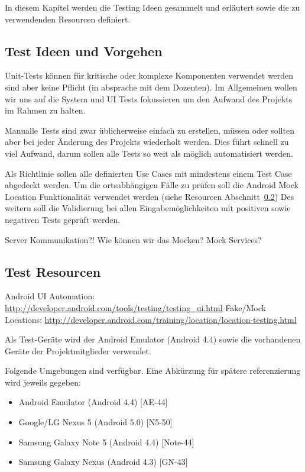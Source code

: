In diesem Kapitel werden die Testing Ideen gesammelt und erläutert sowie die zu verwendenden Resourcen definiert.

\subsection{Test Ideen und Vorgehen}
Unit-Tests können für kritische oder komplexe Komponenten verwendet werden sind aber keine Pflicht (in absprache mit dem Dozenten). 
Im Allgemeinen wollen wir uns auf die System und UI Tests fokussieren um den Aufwand des Projekts im Rahmen zu halten.

\medskip
Manualle Tests sind zwar üblicherweise einfach zu erstellen, müssen oder sollten aber bei jeder Änderung des Projekts wiederholt werden. Dies führt schnell zu viel Aufwand, darum sollen alle Tests so weit als möglich automatisiert werden.

\medskip
Als Richtlinie sollen alle definierten Use Cases mit mindestens einem Test Case abgedeckt werden. Um die ortsabhängigen Fälle zu prüfen soll die Android Mock Location Funktionalität verwendet werden (siehe Resourcen Abschnitt~\ref{sec:test_resources})
Des weitern soll die Validierung bei allen Eingabemöglichkeiten mit positiven sowie negativen Tests geprüft werden.

\medskip
Server Kommunikation?! Wie können wir das Mocken? Mock Services?

\subsection{Test Resourcen}
\label{sec:test_resources}
Android UI Automation: \url{http://developer.android.com/tools/testing/testing_ui.html}
Fake/Mock Locations: \url{http://developer.android.com/training/location/location-testing.html}

\medskip

Als Test-Geräte wird der Android Emulator (Android 4.4) sowie die vorhandenen Geräte der Projektmitglieder verwendet. 

\medskip
Folgende Umgebungen sind verfügbar. Eine Abkürzung für spätere referenzierung wird jeweils gegeben:

\begin{itemize}
\item Android Emulator (Android 4.4) [AE-44]
\item Google/LG Nexus 5 (Android 5.0) [N5-50]
\item Samsung Galaxy Note 5 (Android 4.4) [Note-44]
\item Samsung Galaxy Nexus (Android 4.3) [GN-43]
\end{itemize}

